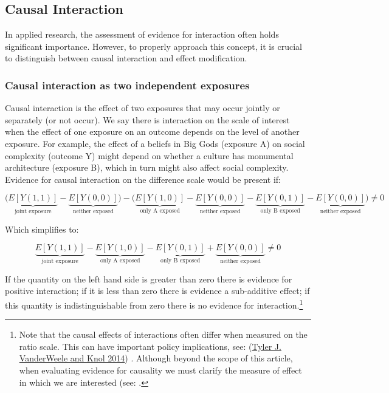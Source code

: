 \documentclass[
  singlecolumn]{report}
\begin{document}
\hypertarget{causal-interaction}{%
\subsection{Causal Interaction}\label{causal-interaction}}

In applied research, the assessment of evidence for interaction often
holds significant importance. However, to properly approach this
concept, it is crucial to distinguish between causal interaction and
effect modification.

\hypertarget{causal-interaction-as-two-independent-exposures}{%
\subsubsection{\texorpdfstring{\textbf{Causal interaction as two
independent
exposures}}{Causal interaction as two independent exposures}}\label{causal-interaction-as-two-independent-exposures}}

Causal interaction is the effect of two exposures that may occur jointly
or separately (or not occur). We say there is interaction on the scale
of interest when the effect of one exposure on an outcome depends on the
level of another exposure. For example, the effect of a beliefs in Big
Gods (exposure A) on social complexity (outcome Y) might depend on
whether a culture has monumental architecture (exposure B), which in
turn might also affect social complexity. Evidence for causal
interaction on the difference scale would be present if:

\[\bigg(\underbrace{E[Y(1,1)]}_{\text{joint exposure}} - \underbrace{E[Y(0,0)]}_{\text{neither exposed}}\bigg) - \bigg(\underbrace{E[Y(1,0)]}_{\text{only A exposed}} - \underbrace{E[Y(0,0)]}_{\text{neither exposed}}- \underbrace{E[Y(0,1)]}_{\text{only B exposed}} - \underbrace{E[Y(0,0)]}_{\text{neither exposed}} \bigg) \neq 0 \]

Which simplifies to:

\[ \underbrace{E[Y(1,1)]}_{\text{joint exposure}} - \underbrace{E[Y(1,0)]}_{\text{only A exposed}} - \underbrace{E[Y(0,1)]}_{\text{only B exposed}} + \underbrace{E[Y(0,0)]}_{\text{neither exposed}} \neq 0 \]

If the quantity on the left hand side is greater than zero there is
evidence for positive interaction; if it is less than zero there is
evidence a sub-additive effect; if this quantity is indistinguishable
from zero there is no evidence for interaction.\footnote{Note that the
  causal effects of interactions often differ when measured on the ratio
  scale. This can have important policy implications, see:
  (\protect\hyperlink{ref-vanderweele2014}{Tyler J. VanderWeele and Knol
  2014}) . Although beyond the scope of this article, when evaluating
  evidence for causality we must clarify the measure of effect in which
  we are interested (see: .}
\end{document}
